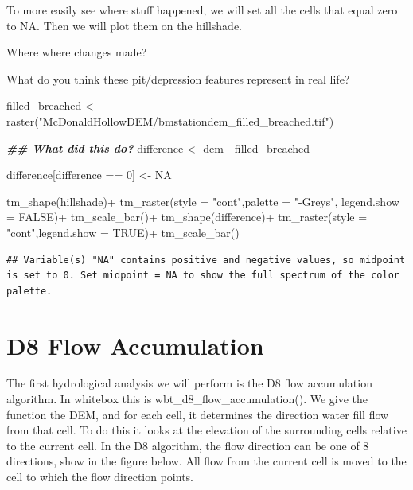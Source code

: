 \documentclass[
]{book}
\newenvironment{Shaded}{\begin{snugshade}}{\end{snugshade}}
\newcommand{\AttributeTok}[1]{\textcolor[rgb]{0.77,0.63,0.00}{#1}}
\newcommand{\ConstantTok}[1]{\textcolor[rgb]{0.00,0.00,0.00}{#1}}
\newcommand{\DecValTok}[1]{\textcolor[rgb]{0.00,0.00,0.81}{#1}}
\newcommand{\DocumentationTok}[1]{\textcolor[rgb]{0.56,0.35,0.01}{\textbf{\textit{#1}}}}
\newcommand{\FunctionTok}[1]{\textcolor[rgb]{0.00,0.00,0.00}{#1}}
\newcommand{\NormalTok}[1]{#1}
\newcommand{\OtherTok}[1]{\textcolor[rgb]{0.56,0.35,0.01}{#1}}
\newcommand{\SpecialCharTok}[1]{\textcolor[rgb]{0.00,0.00,0.00}{#1}}
\newcommand{\StringTok}[1]{\textcolor[rgb]{0.31,0.60,0.02}{#1}}
\begin{document}
To more easily see where stuff happened, we will set all the cells that equal zero to NA. Then we will plot them on the hillshade.

Where where changes made?

What do you think these pit/depression features represent in real life?

\begin{Shaded}
\begin{Highlighting}[]
\NormalTok{filled\_breached }\OtherTok{\textless{}{-}} \FunctionTok{raster}\NormalTok{(}\StringTok{"McDonaldHollowDEM/bmstationdem\_filled\_breached.tif"}\NormalTok{)}

\DocumentationTok{\#\# What did this do?}
\NormalTok{difference }\OtherTok{\textless{}{-}}\NormalTok{ dem }\SpecialCharTok{{-}}\NormalTok{ filled\_breached}

\NormalTok{difference[difference }\SpecialCharTok{==} \DecValTok{0}\NormalTok{] }\OtherTok{\textless{}{-}} \ConstantTok{NA}

\FunctionTok{tm\_shape}\NormalTok{(hillshade)}\SpecialCharTok{+}
  \FunctionTok{tm\_raster}\NormalTok{(}\AttributeTok{style =} \StringTok{"cont"}\NormalTok{,}\AttributeTok{palette =} \StringTok{"{-}Greys"}\NormalTok{, }\AttributeTok{legend.show =} \ConstantTok{FALSE}\NormalTok{)}\SpecialCharTok{+}
  \FunctionTok{tm\_scale\_bar}\NormalTok{()}\SpecialCharTok{+}
\FunctionTok{tm\_shape}\NormalTok{(difference)}\SpecialCharTok{+}
  \FunctionTok{tm\_raster}\NormalTok{(}\AttributeTok{style =} \StringTok{"cont"}\NormalTok{,}\AttributeTok{legend.show =} \ConstantTok{TRUE}\NormalTok{)}\SpecialCharTok{+}
  \FunctionTok{tm\_scale\_bar}\NormalTok{()}
\end{Highlighting}
\end{Shaded}

\begin{verbatim}
## Variable(s) "NA" contains positive and negative values, so midpoint is set to 0. Set midpoint = NA to show the full spectrum of the color palette.
\end{verbatim}

\hypertarget{d8-flow-accumulation}{%
\section{D8 Flow Accumulation}\label{d8-flow-accumulation}}

The first hydrological analysis we will perform is the D8 flow accumulation algorithm. In whitebox this is wbt\_d8\_flow\_accumulation(). We give the function the DEM, and for each cell, it determines the direction water fill flow from that cell. To do this it looks at the elevation of the surrounding cells relative to the current cell. In the D8 algorithm, the flow direction can be one of 8 directions, show in the figure below. All flow from the current cell is moved to the cell to which the flow direction points.
\end{document}

